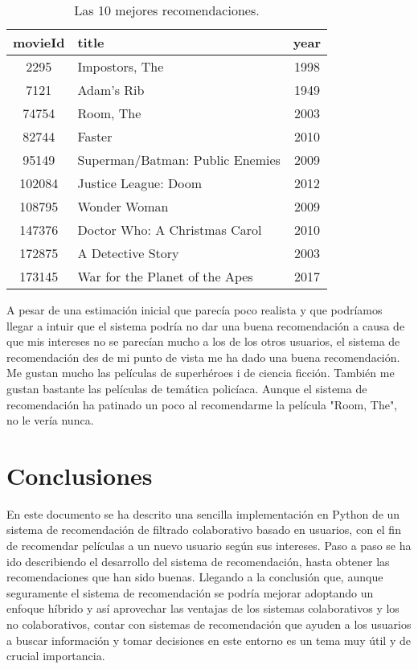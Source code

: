 \documentclass{uimppracticas}
\begin{document}
\begin{table}[H]
	\centering
	\begin{tabular}{clc}
		\toprule
		movieId &                         title &  year \\
		\midrule
		2295 &                   Impostors, The &  1998 \\
		7121 &                       Adam's Rib &  1949 \\
		74754 &                        Room, The &  2003 \\
		82744 &                           Faster &  2010 \\
		95149 &  Superman/Batman: Public Enemies &  2009 \\
		102084 &             Justice League: Doom &  2012 \\
		108795 &                     Wonder Woman &  2009 \\
		147376 &    Doctor Who: A Christmas Carol &  2010 \\
		172875 &                A Detective Story &  2003 \\
		173145 &   War for the Planet of the Apes &  2017 \\
		\bottomrule
	\end{tabular}
	\caption{Las 10 mejores recomendaciones.}
	\label{recomendaciones_finales}
\end{table}

A pesar de una estimación inicial que parecía poco realista y que podríamos llegar a intuir que el sistema podría no dar una buena recomendación a causa de que mis intereses no se parecían mucho a los de los otros usuarios, el sistema de recomendación des de mi punto de vista me ha dado una buena recomendación. Me gustan mucho las películas de superhéroes i de ciencia ficción. También me gustan bastante las películas de temática policíaca. Aunque el sistema de recomendación ha patinado un poco al recomendarme la película "Room, The", no le vería nunca.

\section{Conclusiones}

En este documento se ha descrito una sencilla implementación en Python de un sistema de recomendación de filtrado colaborativo basado en usuarios, con el fin de recomendar películas a un nuevo usuario según sus intereses. Paso a paso se ha ido describiendo el desarrollo del sistema de recomendación, hasta obtener las recomendaciones que han sido buenas. Llegando a la conclusión que, aunque seguramente el sistema de recomendación se podría mejorar adoptando un enfoque híbrido y así aprovechar las ventajas de los sistemas colaborativos y los no colaborativos, contar con sistemas de recomendación que ayuden a los usuarios a buscar información y tomar decisiones en este entorno es un tema muy útil y de crucial importancia.
\end{document}
